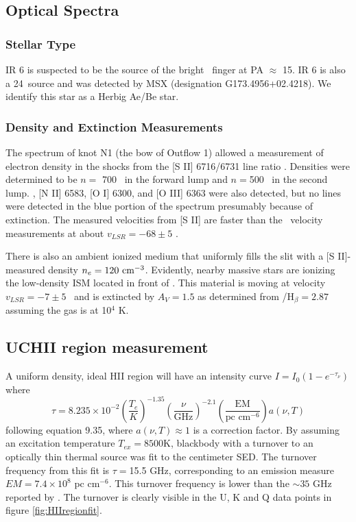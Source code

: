 \subsection{Optical Spectra}
\subsubsection{Stellar Type}
IR 6 is suspected to be the source of the bright \hh\ finger at PA $\approx$
15\arcdeg.  %
IR 6 is also
a 24\um\ source and was detected by MSX (designation G173.4956+02.4218).  We
identify this star as a Herbig Ae/Be star. 

\subsubsection{Density and Extinction Measurements}
The spectrum of knot N1 (the bow of Outflow 1) allowed a measurement of
electron density in the shocks from the [S II] 6716/6731  line ratio
.  Densities were determined to be $n=$ 700 \percc\  in the forward lump
and $n=$500 \percc\ in the second lump.  \ha, [N II] 6583, [O I] 6300, and [O
III] 6363 were also detected, but no lines were detected in the blue portion of
the spectrum presumably because of extinction.  The measured velocities from [S
II] are faster than the \hh\ velocity measurements at about $v_{LSR} = -68
\pm 5$ \kms. 

There is also an ambient ionized medium that uniformly fills the slit with a
[S II]-measured density $n_e=120\ \percc$.  Evidently, nearby massive stars are
ionizing the low-density ISM located in front of \region.   This material is
moving at velocity $v_{LSR} = -7 \pm 5$ \kms\ and is extincted by $A_V=1.5$ as
determined from \ha/H$_\beta=2.87$  assuming the gas is at 10$^4$ K.



\subsection{UCHII region measurement}
A uniform density, ideal HII region will have an intensity curve $I = I_0
( 1 - e^{-\tau_\nu})$ where 
\begin{equation} \tau = 8.235\times10^{-2}
\left(\frac{T_e}{K}\right)^{-1.35} \left(\frac{\nu}{\textrm{GHz}}\right)^{-2.1}
\left(\frac{\textrm{EM}}{\textrm{pc~cm}^{-6}}\right) a(\nu,T)
\end{equation}
following \citet{rohlfs2004} equation 9.35, where $a(\nu,T) \approx 1$ is a
correction factor.   By assuming an excitation temperature $T_{ex} = 8500$K, 
blackbody with a turnover to an optically thin thermal source was fit to the
centimeter SED.  The turnover frequency from this fit is $\tau=$15.5 GHz,
corresponding to an  emission measure $EM=7.4 \times 10^8$ pc cm$^{-6}$.  This
turnover frequency is lower than the $\sim35$ GHz reported by
\citet{beuther2007}.  The turnover is clearly visible in the U, K and Q data
points in figure \ref{fig:HIIregionfit}.  

